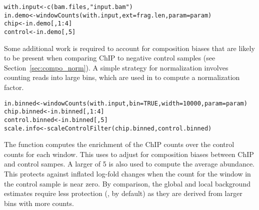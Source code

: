 \documentclass{report}\usepackage[]{graphicx}\usepackage[usenames,dvipsnames]{color}
\newcommand{\hlnum}[1]{\textcolor[rgb]{0.816,0.125,0.439}{#1}}%
\newcommand{\hlstr}[1]{\textcolor[rgb]{0.251,0.627,0.251}{#1}}%
\newcommand{\hlopt}[1]{\textcolor[rgb]{0,0,0}{#1}}%
\newcommand{\hlstd}[1]{\textcolor[rgb]{0.251,0.251,0.251}{#1}}%
\newcommand{\hlkwb}[1]{\textcolor[rgb]{0,0,0}{#1}}%
\newcommand{\hlkwc}[1]{\textcolor[rgb]{0.251,0.251,0.251}{#1}}%
\newcommand{\hlkwd}[1]{\textcolor[rgb]{0.878,0.439,0.125}{#1}}%
\newenvironment{knitrout}{}{} %
\begin{document}
\begin{knitrout}
\color{fgcolor}\begin{kframe}
\begin{alltt}
\hlstd{with.input} \hlkwb{<-} \hlkwd{c}\hlstd{(bam.files,} \hlstr{"input.bam"}\hlstd{)}
\hlstd{in.demo} \hlkwb{<-} \hlkwd{windowCounts}\hlstd{(with.input,} \hlkwc{ext}\hlstd{=frag.len,} \hlkwc{param}\hlstd{=param)}
\hlstd{chip} \hlkwb{<-} \hlstd{in.demo[,}\hlnum{1}\hlopt{:}\hlnum{4}\hlstd{]}
\hlstd{control} \hlkwb{<-} \hlstd{in.demo[,}\hlnum{5}\hlstd{]}
\end{alltt}
\end{kframe}
\end{knitrout}

Some additional work is required to account for composition biases that are likely to be present when comparing ChIP to negative control samples (see Section~\ref{sec:compo_norm}).
A simple strategy for normalization involves counting reads into large bins, which are used in  to compute a normalization factor.

\begin{knitrout}
\color{fgcolor}\begin{kframe}
\begin{alltt}
\hlstd{in.binned} \hlkwb{<-} \hlkwd{windowCounts}\hlstd{(with.input,} \hlkwc{bin}\hlstd{=}\hlnum{TRUE}\hlstd{,} \hlkwc{width}\hlstd{=}\hlnum{10000}\hlstd{,} \hlkwc{param}\hlstd{=param)}
\hlstd{chip.binned} \hlkwb{<-} \hlstd{in.binned[,}\hlnum{1}\hlopt{:}\hlnum{4}\hlstd{]}
\hlstd{control.binned} \hlkwb{<-} \hlstd{in.binned[,}\hlnum{5}\hlstd{]}
\hlstd{scale.info} \hlkwb{<-} \hlkwd{scaleControlFilter}\hlstd{(chip.binned, control.binned)}
\end{alltt}
\end{kframe}
\end{knitrout}

The  function computes the enrichment of the ChIP counts over the control counts for each window.
This uses  to adjust for composition biases between ChIP and control sampes.
A larger  of 5 is also used to compute the average abundance.
This protects against inflated log-fold changes when the count for the window in the control sample is near zero.
By comparison, the global and local background estimates require less protection (, by default) as they are derived from larger bins with more counts.
\end{document}
